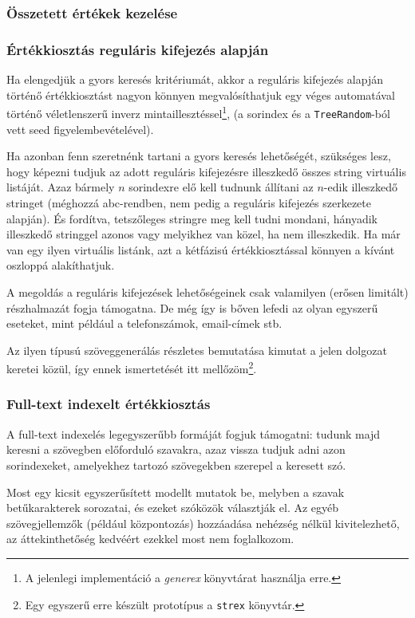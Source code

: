 \documentclass[
    parspace, %
    noindent, %
]{elteiktdk}[2023/04/10]
\begin{document}
\subsubsection{Összetett értékek kezelése}

\subsubsection{Értékkiosztás reguláris kifejezés alapján}

Ha elengedjük a gyors keresés kritériumát,
akkor a reguláris kifejezés alapján történő értékkiosztást nagyon könnyen megvalósíthatjuk
egy véges automatával történő véletlenszerű inverz mintaillesztéssel\footnote{
  A jelenlegi implementáció a \textit{generex} könyvtárat használja erre.
},
(a sorindex és a \texttt{TreeRandom}-ból vett seed figyelembevételével).

Ha azonban fenn szeretnénk tartani a gyors keresés lehetőségét,
szükséges lesz, hogy képezni tudjuk az adott reguláris kifejezésre illeszkedő összes string virtuális listáját.
Azaz bármely $n$ sorindexre elő kell tudnunk állítani az $n$-edik illeszkedő stringet
(méghozzá abc-rendben, nem pedig a reguláris kifejezés szerkezete alapján).
És fordítva, tetszőleges stringre meg kell tudni mondani,
hányadik illeszkedő stringgel azonos vagy melyikhez van közel, ha nem illeszkedik.
Ha már van egy ilyen virtuális listánk, azt a kétfázisú értékkiosztással könnyen a kívánt oszloppá alakíthatjuk.

A megoldás a reguláris kifejezések lehetőségeinek csak valamilyen (erősen limitált) részhalmazát fogja támogatna.
De még így is bőven lefedi az olyan egyszerű eseteket, mint például a telefonszámok, email-címek stb.

Az ilyen típusú szöveggenerálás részletes bemutatása kimutat a jelen dolgozat keretei közül,
így ennek ismertetését itt mellőzöm\footnote{
  Egy egyszerű erre készült prototípus a \texttt{strex} könyvtár.
}.

\subsubsection{Full-text indexelt értékkiosztás}

A full-text indexelés legegyszerűbb formáját fogjuk támogatni:
tudunk majd keresni a szövegben előforduló szavakra,
azaz vissza tudjuk adni azon sorindexeket,
amelyekhez tartozó szövegekben szerepel a keresett szó.

Most egy kicsit egyszerűsített modellt mutatok be,
melyben a szavak betűkarakterek sorozatai,
és ezeket szóközök választják el.
Az egyéb szövegjellemzők (például központozás) hozzáadása nehézség nélkül kivitelezhető,
az áttekinthetőség kedvéért ezekkel most nem foglalkozom.
\end{document}
